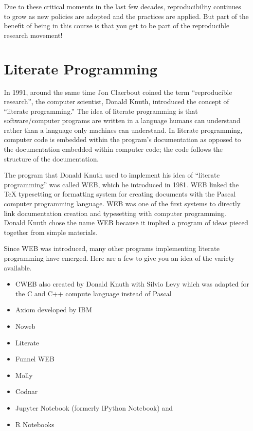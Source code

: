 \documentclass[]{book}
\providecommand{\tightlist}{%
  \setlength{\itemsep}{0pt}\setlength{\parskip}{0pt}}
\theoremstyle{definition}
\theoremstyle{definition}
\theoremstyle{definition}
\theoremstyle{remark}
\begin{document}
Due to these critical moments in the last few decades, reproducibility
continues to grow as new policies are adopted and the practices are
applied. But part of the benefit of being in this course is that you get
to be part of the reproducible research movement!

\section{Literate Programming}\label{literate-programming}

In 1991, around the same time Jon Claerbout coined the term
``reproducible research'', the computer scientist, Donald Knuth,
introduced the concept of ``literate programming.'' The idea of literate
programming is that software/computer programs are written in a language
humans can understand rather than a language only machines can
understand. In literate programming, computer code is embedded within
the program's documentation as opposed to the documentation embedded
within computer code; the code follows the structure of the
documentation.

The program that Donald Knuth used to implement his idea of ``literate
programming'' was called WEB, which he introduced in 1981. WEB linked
the TeX typesetting or formatting system for creating documents with the
Pascal computer programming language. WEB was one of the first systems
to directly link documentation creation and typesetting with computer
programming. Donald Knuth chose the name WEB because it implied a
program of ideas pieced together from simple materials.

Since WEB was introduced, many other programs implementing literate
programming have emerged. Here are a few to give you an idea of the
variety available.

\begin{itemize}
\tightlist
\item
  CWEB also created by Donald Knuth with Silvio Levy which was adapted
  for the C and C++ compute language instead of Pascal
\item
  Axiom developed by IBM
\item
  Noweb
\item
  Literate
\item
  Funnel WEB
\item
  Molly
\item
  Codnar
\item
  Jupyter Notebook (formerly IPython Notebook) and
\item
  R Notebooks
\end{itemize}
\end{document}
